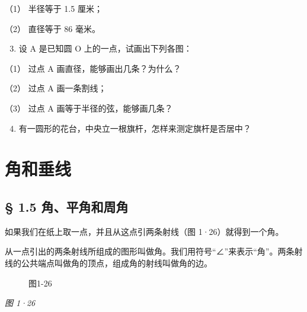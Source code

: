 （1） 半径等于 1.5 厘米；

（2） 直径等于 86 毫米。

\begin{enumerate}
\setcounter{enumi}{2}
\item
  设 A 是已知圆 O 上的一点，试画出下列各图：
\end{enumerate}

（1） 过点 A 画直径，能够画出几条？为什么？

（2） 过点 A 画一条割线；

（3） 过点 A 画等于半径的弦，能够画几条？

\begin{enumerate}
\setcounter{enumi}{3}
\item
  有一圆形的花台，中央立一根旗杆，怎样来测定旗杆是否居中？
\end{enumerate}

\section{角和垂线}

\subsection{§ 1.5
角、平角和周角}

如果我们在纸上取一点，并且从这点引两条射线（图 1·26）就得到一个角。

从一点引出的两条射线所组成的图形叫做角。我们用符号``∠''来表示``角''。两条射线的公共端点叫做角的顶点，组成角的射线叫做角的边。

\begin{figure}
\centering
{}
\caption{图1-26}
\end{figure}

\emph{图 1·26}

